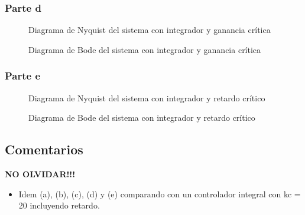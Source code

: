 \subsubsection{Parte d}

\begin{figure}[h]
  \centering
  
  \caption{Diagrama de Nyquist del sistema con integrador y ganancia crítica}
  \label{fig:nyquist-f2}
\end{figure}

\begin{figure}[h]
  \centering
  
  \caption{Diagrama de Bode del sistema con integrador y ganancia crítica}
  \label{fig:bode-f2}
\end{figure}

\subsubsection{Parte e}

\begin{figure}[h]
  \centering
  
  \caption{Diagrama de Nyquist del sistema con integrador y retardo crítico}
  \label{fig:nyquist-f3}
\end{figure}

\begin{figure}[h]
  \centering
  
  \caption{Diagrama de Bode del sistema con integrador y retardo crítico}
  \label{fig:bode-f3}
\end{figure}

\FloatBarrier
\subsection{Comentarios}

\textbf{NO OLVIDAR!!!}

\begin{itemize}
  \item Idem (a), (b), (c), (d) y (e) comparando con un controlador integral con kc = 20 incluyendo retardo.
\end{itemize}

